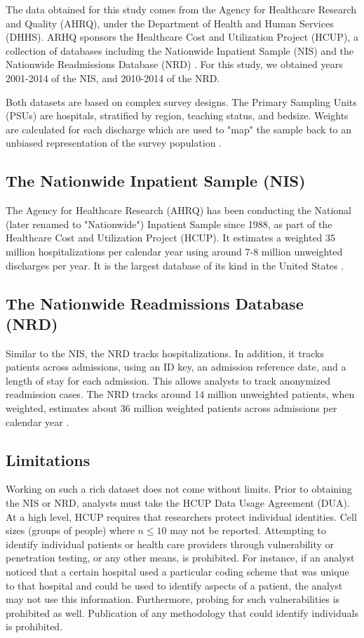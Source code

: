The data obtained for this study comes from the Agency for Healthcare Research and Quality (AHRQ),
under the Department of Health and Human Services (DHHS). ARHQ sponsors the
Healthcare Cost and Utilization Project (HCUP), a collection of databases including the Nationwide Inpatient Sample (NIS) and
the Nationwide Readmissions Database (NRD) \cite{HCUPOverview}. For this study, we obtained years 2001-2014 of the NIS, and
2010-2014 of the NRD.

Both datasets are based on complex survey designs. The Primary Sampling Units (PSUs) are hospitals, stratified by region,
teaching status, and bedsize. Weights are calculated for each discharge which are used to "map" the sample back to an unbiased
representation of the survey population \cite{Heeringa2017}.

\subsection{The Nationwide Inpatient Sample (NIS)}

The Agency for Healthcare Research (AHRQ) has been conducting the National (later renamed to "Nationwide") Inpatient
Sample since 1988, as part of the Healthcare Cost and Utilization Project (HCUP). It estimates a weighted 35 million
hospitalizations per calendar year using around 7-8 million unweighted discharges per year. It is the largest database
of its kind in the United States \cite{NISOverview}.

\subsection{The Nationwide Readmissions Database (NRD)}

Similar to the NIS, the NRD tracks hospitalizations. In addition, it tracks patients across admissions, using an ID key,
an admission reference date, and a length of stay for each admission. This allows analysts to track anonymized readmission cases.
The NRD tracks around 14 million unweighted patients, when weighted, estimates about 36 million weighted patients across admissions 
per calendar year \cite{NRDOverview}.

\subsection{Limitations}

Working on such a rich dataset does not come without limits. Prior to obtaining the NIS or NRD, analysts must take the HCUP
Data Usage Agreement (DUA). At a high level, HCUP requires that researchers protect individual identities. Cell sizes (groups of people)
where $n \le 10$ may not be reported. Attempting to identify individual patients or health care providers through vulnerability or penetration testing, 
or any other means, is prohibited. For instance, if an analyst noticed that a certain hospital used a particular coding scheme that was unique 
to that hospital and could be used to identify aspects of a patient, the analyst may not use this information. Furthermore, probing for such
vulnerabilities is prohibited as well. Publication of any methodology that could identify individuals is prohibited.

